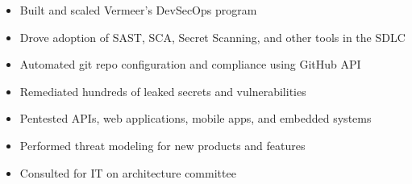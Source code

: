 \documentclass[../../main.tex]{subfiles}
\begin{document}
\begin{itemize}
    \item Built and scaled Vermeer's DevSecOps program
    \item Drove adoption of SAST, SCA, Secret Scanning, and other tools in the SDLC
    \item Automated git repo configuration and compliance using GitHub API
    \item Remediated hundreds of leaked secrets and vulnerabilities
    \item Pentested APIs, web applications, mobile apps, and embedded systems
    \item Performed threat modeling for new products and features
    \item Consulted for IT on architecture committee
\end{itemize}
\end{document}
